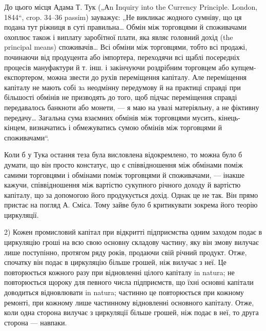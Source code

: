 До цього місця Адама Т. Тук („Аn Inquiry into the Currency Principle.
London, 1844“, crop. 34--36 passim) зауважує: „Не викликає жодного
сумніву, що ця подана тут ріжниця в суті правильна\dots{} Обмін між торговцями
й споживачами охоплює також і виплату заробітної плати, яка
являє головний дохід (the principal means) споживачів\dots{} Всі обміни між
торговцями, тобто всі продажі, починаючи від продуцента або імпортера,
переходячи всі щаблі посередніх процесів мануфактури й т. інш. і закінчуючи
роздрібним торговцем або купцем-експортером, можна звести
до рухів переміщення капіталу. Але переміщення капіталу не мають собі
зa неодмінну передумову й на практиці справді при більшості обмінів не
призводять до того, щоб підчас переміщення справді передавалось банкноти
або монети, — я маю на увазі матеріяльну, а не фіктивну передачу\dots{}
Загальна сума взаємних обмінів між торговцями мусить, кінець-кінцем,
визначатись і обмежуватись сумою обмінів між торговцями й споживачами“.

Коли б у Тука остання теза була висловлена відокремлено, то можна
було б думати, що він просто констатує, що є співвідношення між обмінами
поміж самими торговцями і обмінами поміж торговцями й споживачами, —
інакше кажучи, співвідношення між вартістю сукупного річного доходу й
вартістю капіталу, що за допомогою його продукується дохід. Однак це
не так. Він прямо пристає на погляд А. Сміса. Тому зайве було б
критикувати зокрема його теорію циркуляції.

2) Кожен промисловий капітал при відкритті підприємства одним заходом
подає в циркуляцію гроші на всю свою основну складову частину, яку
він змову вилучає лише поступінно, протягом ряду років, продаючи свій
річний продукт. Отже, спочатку він подає в циркуляцію більше грошей,
ніж вилучає з неї. Це повторюється кожного разу при відновленні цілого
капіталу in natura; не повторюється щороку для певного числа підприємств,
що їхні основні капітали доводиться відновлювати in natura; частинно
це повторюється при кожному ремонті, при кожному лише частинному
відновленні основного капіталу. Отже, коли одна сторона
вилучає з циркуляції більше грошей, ніж подає в неї, то друга сторона —
навпаки.

